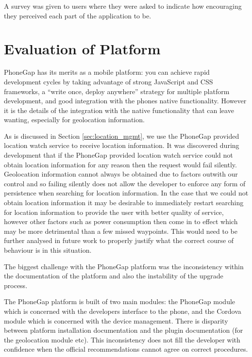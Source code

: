 A survey was given to users where they were asked to indicate how
encouraging they perceived each part of the application to be.

\section{Evaluation of Platform}
PhoneGap has its merits as a mobile platform: you can achieve rapid
development cycles by taking advantage of strong JavaScript and CSS
frameworks, a ``write once, deploy anywhere'' strategy for multiple
platform development, and good integration with the phones native
functionality. However it is the details of the integration with the
native functionality that can leave wanting, especially for
geolocation information.

As is discussed in Section \ref{sec:location_mgmt}, we use the PhoneGap
provided location watch service to receive location information. It
was discovered during development that if the PhoneGap provided
location watch service could not obtain location information for any
reason then the request would fail silently. Geolocation information
cannot always be obtained due to factors outwith our control and so
failing silently does not allow the developer to enforce any form of
persistence when searching for location information. In the case that
we could not obtain location information it may be desirable to
immediately restart searching for location information to provide the
user with better quality of service, however other factors such as
power consumption then come in to effect which may be more detrimental
than a few missed waypoints. This would need to be further analysed in
future work to properly justify what the correct course of behaviour
is in this situation.

The biggest challenge with the PhoneGap platform was the inconsistency
within the documentation of the platform and also the instability of
the upgrade process. 

The PhoneGap platform is built of two main modules: the PhoneGap
module which is concerned with the developers interface to the phone,
and the Cordova module which is concerned with the device management.
There is disparity between platform installation documentation and the
plugin documentation (for the geolocation module
etc)\cite{phonegap_install, phonegap_cli,
  phonegap_geolocationAccessingFeature}. This inconsistency does not
fill the developer with confidence when the official recommendations
cannot agree on correct procedures. 


